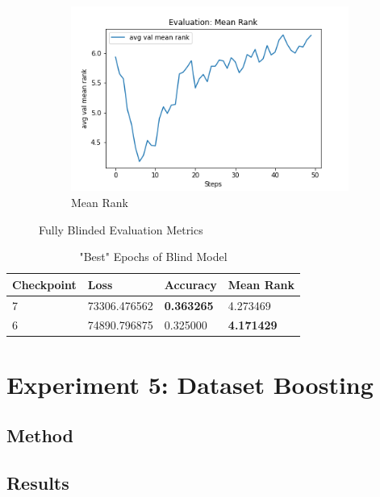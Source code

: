 \begin{figure}[H]
\begin{subfigure}[b]{0.3\textwidth}
         \includegraphics[width=\textwidth]{./figure/results/fully_blinded/eval/avg val mean rank.png}
         \caption{Mean Rank}
         \label{fig:fb_e_mean_rank}
     \end{subfigure}
     \caption{Fully Blinded Evaluation Metrics}
     \label{fig:fb_e_metrics}
\end{figure}

\begin{table}[H]
\centering
\caption{"Best" Epochs of Blind Model}
\begin{tabular}{l | l | l | l}
Checkpoint & Loss & Accuracy & Mean Rank \\
\hline
7 & 73306.476562 & \textbf{0.363265} & 4.273469 \\
6 & 74890.796875 & 0.325000 & \textbf{4.171429}
\end{tabular}
\label{tab:best_blind}
\end{table}

\section{Experiment 5: Dataset Boosting}
\label{sec:exp_5}
\subsection{Method}

\subsection{Results}

